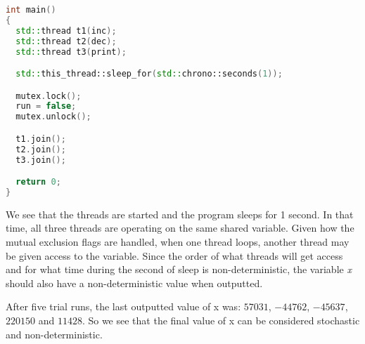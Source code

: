 \begin{lstlisting}[language=C++, caption=Main method]
int main()
{
  std::thread t1(inc);
  std::thread t2(dec);
  std::thread t3(print);

  std::this_thread::sleep_for(std::chrono::seconds(1));

  mutex.lock();
  run = false;
  mutex.unlock();

  t1.join();
  t2.join();
  t3.join();

  return 0;
}
\end{lstlisting}

We see that the threads are started and the program sleeps for 1 second.
In that time, all three threads are operating on the same shared variable.
Given how the mutual exclusion flags are handled, when one thread loops, another
thread may be given access to the variable. Since the order of what threads will
get access and for what time during the second of sleep is non-deterministic, the
variable \textit{x} should also have a non-deterministic value when outputted.

After five trial runs, the last outputted value of x was: $57031$, $-44762$, 
$-45637$, $220150$ and $11428$. So we see that the final value of x can be 
considered stochastic and non-deterministic. 